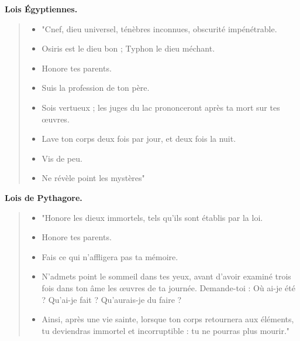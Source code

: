 \vfill
\newpage
\textbf{Lois Égyptiennes.}

\begin{quote}
\begin{itemize}
\item "Cnef, dieu universel, ténèbres inconnues, obscurité impénétrable.
\item Osiris est le dieu bon ; Typhon le dieu méchant.
\item Honore tes parents.
\item Suis la profession de ton père.
\item Sois vertueux ; les juges du lac prononceront après ta mort
sur tes œuvres.
\item Lave ton corps deux fois par jour, et deux fois la nuit.
\item Vis de peu.
\item Ne révèle point les mystères"
\end{itemize}
\end{quote}

\vfill
\newpage
\textbf{Lois de Pythagore.}

\begin{quote}
\begin{itemize}
\item "Honore les dieux immortels, tels qu’ils sont établis par la loi.
\item Honore tes parents.
\item Fais ce qui n’affligera pas ta mémoire.
\item N’admets point le sommeil dans tes yeux, avant d’avoir examiné trois fois dans ton âme les œuvres de ta journée. Demande-toi : Où ai-je été ? Qu’ai-je fait ? Qu’aurais-je du faire ?
\item Ainsi, après une vie sainte, lorsque ton corps retournera aux éléments, tu deviendras immortel et incorruptible : tu ne pourras plus mourir."
\end{itemize}
\end{quote}

